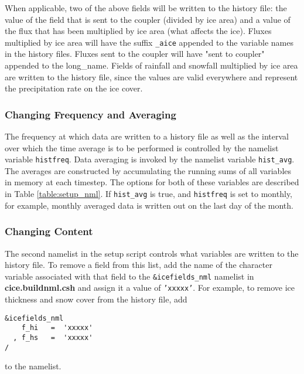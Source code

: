 When applicable, two of the above fields will be written to the
history file:  the value of the field that is sent to the coupler
(divided by ice area) and a value of the flux that has been multiplied by
ice area (what affects the ice). Fluxes multiplied by ice area will have
the suffix {\tt \_aice} appended to the variable names in the history files.
Fluxes sent to the coupler will have "sent to coupler" appended to the
long\_name.  Fields of rainfall and snowfall multiplied by ice area are
written to the history file, since the values are valid everywhere and
represent the precipitation rate on the ice cover.




\subsubsection{Changing Frequency and Averaging} 

The frequency at which data are written to a history file as well as the
interval over which the time average is to be performed is controlled
by the namelist variable {\tt histfreq}.  Data averaging is invoked
by the namelist variable {\tt hist\_avg}.  The averages are constructed
by accumulating the running sums of all variables in memory at each timestep.
The options for both of these variables are described in Table 
\ref{table:setup_nml}.  If {\tt hist\_avg} is true, and {\tt histfreq}
is set to monthly, for example, monthly averaged data is written out on
the last day of the month.

\subsubsection{Changing Content} 
\label{change_content}

The second namelist in the setup script controls what variables are written
to the history file. To remove a field from this list, add the name of the
character variable associated with that field to the {\tt \&icefields\_nml}
namelist in {\bf cice.buildnml.csh}
and assign it a value of {\tt 'xxxxx'}.  For example, to remove
ice thickness and snow cover from the history file, add

\begin{verbatim}
&icefields_nml
    f_hi   =  'xxxxx'
  , f_hs   =  'xxxxx'
/
\end{verbatim}
to the namelist.  

